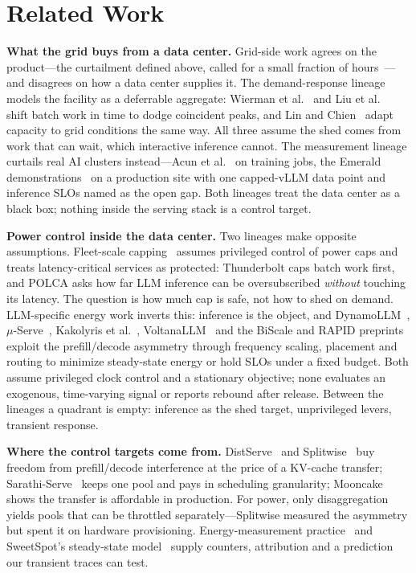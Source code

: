 \documentclass[conference,10pt]{IEEEtran}
\begin{document}
\section{Related Work}
\textbf{What the grid buys from a data center.} Grid-side work agrees on the product---the curtailment defined above, called for a small fraction of hours~\cite{norris2025rethinking,khanal2026shift}---and disagrees on how a data center supplies it. The demand-response lineage models the facility as a deferrable aggregate: Wierman et al.~\cite{wierman2014dcdr} and Liu et al.~\cite{liu2013dcdr} shift batch work in time to dodge coincident peaks, and Lin and Chien~\cite{lin2023adapting} adapt capacity to grid conditions the same way. All three assume the shed comes from work that can wait, which interactive inference cannot. The measurement lineage curtails real AI clusters instead---Acun et al.~\cite{acun2026flexdc} on training jobs, the Emerald demonstrations~\cite{colangelo2025phoenix,williams2026powerflex} on a production site with one capped-vLLM data point and inference SLOs named as the open gap. Both lineages treat the data center as a black box; nothing inside the serving stack is a control target.

\textbf{Power control inside the data center.} Two lineages make opposite assumptions. Fleet-scale capping~\cite{wu2016dynamo,li2020thunderbolt,patel2024polca} assumes privileged control of power caps and treats latency-critical services as protected: Thunderbolt caps batch work first, and POLCA asks how far LLM inference can be oversubscribed \emph{without} touching its latency. The question is how much cap is safe, not how to shed on demand. LLM-specific energy work inverts this: inference is the object, and DynamoLLM~\cite{stojkovic2025dynamollm}, $\mu$-Serve~\cite{qiu2024userve}, Kakolyris et al.~\cite{kakolyris2024slo}, VoltanaLLM~\cite{yu2026voltana} and the BiScale and RAPID preprints~\cite{dualscale2026,rapid2026} exploit the prefill/decode asymmetry through frequency scaling, placement and routing to minimize steady-state energy or hold SLOs under a fixed budget. Both assume privileged clock control and a stationary objective; none evaluates an exogenous, time-varying signal or reports rebound after release. Between the lineages a quadrant is empty: inference as the shed target, unprivileged levers, transient response.

\textbf{Where the control targets come from.} DistServe~\cite{zhong2024distserve} and Splitwise~\cite{patel2024splitwise} buy freedom from prefill/decode interference at the price of a KV-cache transfer; Sarathi-Serve~\cite{agrawal2024sarathi} keeps one pool and pays in scheduling granularity; Mooncake~\cite{qin2025mooncake} shows the transfer is affordable in production. For power, only disaggregation yields pools that can be throttled separately---Splitwise measured the asymmetry but spent it on hardware provisioning. Energy-measurement practice~\cite{you2023zeus,niu2026tokenpowerbench} and SweetSpot's steady-state model~\cite{cavagna2026sweetspot} supply counters, attribution and a prediction our transient traces can test.
\end{document}
